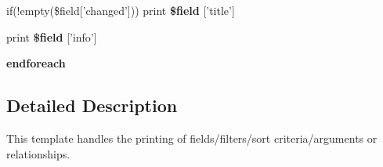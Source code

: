 \begin{CompactItemize}
\item 
\hypertarget{views-ui-edit-item_8tpl_8php_27831f42dc27b33af9fc6fa4ed471b2a}{
if(!empty(\$field\mbox{[}'changed'\mbox{]})) print \textbf{\$field} \mbox{[}'title'\mbox{]}}
\label{views-ui-edit-item_8tpl_8php_27831f42dc27b33af9fc6fa4ed471b2a}

\item 
\hypertarget{views-ui-edit-item_8tpl_8php_435dc5369f02964e90d0212ff8816c8e}{
print \textbf{\$field} \mbox{[}'info'\mbox{]}}
\label{views-ui-edit-item_8tpl_8php_435dc5369f02964e90d0212ff8816c8e}

\item 
\hypertarget{views-ui-edit-item_8tpl_8php_672d9707ef91db026c210f98cc601123}{
\textbf{endforeach}}
\label{views-ui-edit-item_8tpl_8php_672d9707ef91db026c210f98cc601123}

\end{CompactItemize}


\subsection{Detailed Description}
This template handles the printing of fields/filters/sort criteria/arguments or relationships. 
